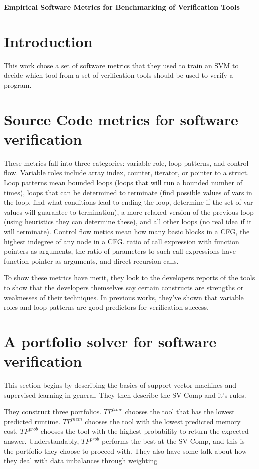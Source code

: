 \documentclass[a4paper]{article}
\begin{document}
\begin{center}
    \Large
    \textbf{Empirical Software Metrics for Benchmarking of Verification Tools}
\end{center} 
\section{Introduction}
This work chose a set of software metrics that they used to train an SVM to decide which
tool from a set of verification tools should be used to verify a program. 

\section{Source Code metrics for software verification}
These metrics fall into three categories: variable role, loop patterns, and control flow. Variable roles include 
array index, counter, iterator, or pointer to a struct. Loop patterns mean bounded loops (loops that will 
run a bounded number of times), loops that can be determined to terminate (find possible values of vars in the 
loop, find what conditions lead to ending the loop, determine if the set of var values will guarantee to 
termination), a more relaxed version of the previous loop (using heuristics they can determine these),
and all other loops (no real idea if it will terminate). Control flow metics mean how many basic blocks in a CFG,
the highest indegree of any node in a CFG. ratio of call expression with function pointers as arguments, the 
ratio of parameters to such call expressions have function pointer as arguments, and direct recursion calls.

To show these metrics have merit, they look to the developers reports of the tools to show that the developers 
themselves say certain constructs are strengths or weaknesses of their techniques. In previous works, they've shown
that variable roles and loop patterns are good predictors for verification success.

\section{A portfolio solver for software verification}
This section begins by describing the basics of support vector machines and supervised learning in general.
They then describe the SV-Comp and it's rules.

They construct three portfolios. $TP^{time}$ chooses the tool that has the lowest predicted runtime. $TP^{mem}$
chooses the tool with the lowest predicted memory cost. $TP^{prob}$ chooses the tool with the highest probability to 
return the expected answer. Understandably, $TP^{prob}$ performs the best at the SV-Comp, and this is the portfolio
they choose to proceed with. They also have some talk about how they deal with data imbalances through weighting
\end{document}
